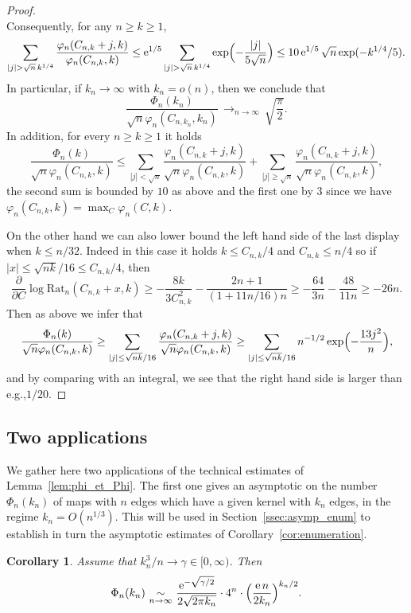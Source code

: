 \documentclass[11pt]{article}
\newcommand{\eg}{e.g.,\xspace}
\theoremstyle{plain}
\newtheorem{corollary}[theorem]{Corollary}
\theoremstyle{definition}
\theoremstyle{remark}
\newcommand{\e}{\operatorname{e}}
\newcommand{\cv}[1][n]{\,\mathop{\longrightarrow}^{}_{#1 \to \infty}\,}
\begin{document}
\begin{proof}
\[\]
Consequently, for any $n\ge k \ge 1$,
\[
\sum_{|j| > \sqrt{n}\,k^{1/4}} \frac{\varphi_{n}(C_{n,k}+j,k)}{\varphi_{n}(C_{n,k},k)}
\leq \e^{1/5} \sum_{|j| > \sqrt{n}\,k^{1/4}} \exp\Bigl(- \frac{|j|}{5\sqrt{n}}\Bigr)
\leq 10 \e^{1/5} \sqrt{n} \exp(- k^{1/4}/5).
\]
In particular, if $k_n \to\infty$ with $k_n = o(n)$, then we conclude that
\[
\frac{\Phi_n(k_n)}{\sqrt{n} \varphi_{n}(C_{n,k_n},k_n)} \cv \sqrt{\frac{\pi}{2}}.
\]
In addition, for every $n \ge k \ge 1$ it holds
\[
\frac{\Phi_n(k)}{\sqrt{n} \varphi_{n}(C_{n,k},k)}
\le \sum_{|j| < \sqrt{n}} \frac{\varphi_{n}(C_{n,k}+j,k)}{\sqrt{n} \varphi_{n}(C_{n,k},k)} + \sum_{|j| \ge \sqrt{n}} \frac{\varphi_{n}(C_{n,k}+j,k)}{\sqrt{n} \varphi_{n}(C_{n,k},k)},
\]
the second sum is bounded by $10$ as above and the first one by $3$ since we have $\varphi_{n}(C_{n,k},k) = \max_C \varphi_{n}(C,k)$.

On the other hand we can also lower bound the left hand side of the last display when $k \le n/32$. Indeed in this case it holds $k \le C_{n,k}/4$ and $C_{n,k} \le n/4$ so if $|x| \le \sqrt{nk}/16 \le C_{n,k}/4$, then\vspace*{-3pt}
\[
\frac{\partial}{\partial C} \log \mathrm{Rat}_n(C_{n,k}+x,k)
\ge - \frac{8k}{3 C_{n,k}^2} - \frac{2n+1}{(1+11n/16) n}
\ge - \frac{64}{3 n} - \frac{48}{11n}
\ge -26n.
\]
Then as above we infer that
\[
\frac{\Phi_n(k)}{\sqrt{n} \varphi_{n}(C_{n,k},k)}
\ge \sum_{|j| \leq \sqrt{nk}/16} \frac{\varphi_{n}(C_{n,k}+j,k)}{\sqrt{n} \varphi_{n}(C_{n,k},k)}
\ge \sum_{|j| \leq \sqrt{nk}/16} n^{-1/2} \exp\Bigl(-\frac{13 j^2}{n}\Bigr),
\]
and by comparing with an integral, we see that the right hand side is larger than \eg $1/20$.
\end{proof}

\subsection{Two applications}

We gather here two applications of the technical estimates of Lemma~\ref{lem:phi_et_Phi}. The first one gives an asymptotic on the number $\Phi_{n}(k_{n})$ of maps with $n$ edges which have a given kernel with $k_{n}$ edges, in the regime $k_n = O(n^{1/3})$. This will be used in Section~\ref{ssec:asymp_enum} to establish in turn the asymptotic estimates of Corollary~\ref{cor:enumeration}.

\begin{corollary}
\label{cor:equivPhikn}
Assume that $k_{n}^3/n \to \gamma \in [0,\infty)$. Then\vspace*{-3pt}
\[
\Phi_{n}(k_{n}) \, \mathop{\sim}_{n \rightarrow \infty} \,
\frac{\e^{- \sqrt{\gamma/2}}}{2\sqrt{2 \pi k_{n}}} \cdot 4^{n} \cdot \Bigl(\frac{\e n}{2 k_{n}}\Bigr)^{k_{n}/2}.
\]
\end{corollary}
\end{document}
